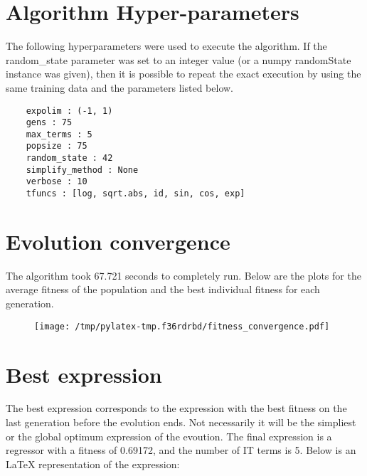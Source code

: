 \documentclass{article}%
\begin{document}
%
\vfill \pagebreak

%
\section*{Algorithm Hyper-parameters}%
\label{sec:AlgorithmHyper{-}parameters}%

                The following hyperparameters were used to execute the
                algorithm. If the random\_state parameter was set to an 
                integer value (or a numpy randomState instance was given), then
                it is possible to repeat the exact execution by using the same
                training data and the parameters listed below.%
{\footnotesize \begin{verbatim}    expolim : (-1, 1)
    gens : 75
    max_terms : 5
    popsize : 75
    random_state : 42
    simplify_method : None
    verbose : 10
    tfuncs : [log, sqrt.abs, id, sin, cos, exp]\end{verbatim} } \vfill \pagebreak

%

            \chead{}
            \rhead{\today, \currenttime}
            
            \lfoot{}
            \cfoot{}
            \rfoot{\thepage\ | \pageref{LastPage}}
\section*{Evolution convergence}%
\label{sec:Evolutionconvergence}%

                The algorithm took 67.721 seconds to
                completely run. Below are the plots for the average fitness
                of the population and the best individual fitness for each
                generation.\vfill%


\begin{figure}[H]%
\centering%
\texttt{[image: /tmp/pylatex-tmp.f36rdrbd/fitness\_convergence.pdf]}%
\end{figure}

%
\vfill \pagebreak

%
\section*{Best expression}%
\label{sec:Bestexpression}%

                The best expression corresponds to the expression with
                the best fitness on the last generation before the evolution
                ends. Not necessarily it will be the simpliest or the global
                optimum expression of the evoution. The final expression is a regressor with a fitness of
                0.69172, and the number of IT terms is
                5. Below is an LaTeX representation
                of the expression:
                
\end{document}
